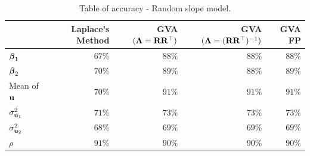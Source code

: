 \begin{table}
	{\footnotesize
	\begin{tabular}{|l|rrrr|}
		\hline
		                   & Laplace's Method & GVA $({\boldsymbol \Lambda} = {\bf R} {\bf R}^\top)$ & GVA $({\boldsymbol \Lambda} = ({\bf R} {\bf R}^\top)^{-1})$ & GVA FP \\
		\hline
		${\boldsymbol \beta}_1$         & $67\%$             & $88\%$                            & $88\%$                                   & $88\%$   \\
		${\boldsymbol \beta}_2$         & $70\%$             & $89\%$                            & $88\%$                                   & $89\%$   \\
		Mean of ${\bf u}$      & $70\%$             & $91\%$                            & $91\%$                                   & $91\%$   \\
		$\sigma^2_{{\bf u}_1}$ & $71\%$             & $73\%$                            & $73\%$                                   & $73\%$   \\
		$\sigma^2_{{\bf u}_2}$ & $68\%$             & $69\%$                            & $69\%$                                   & $69\%$   \\
		$\rho$             & $91\%$             & $90\%$                            & $90\%$                                   & $90\%$   \\
		\hline
	\end{tabular}
}\bigskip
	\caption{Table of accuracy - Random slope model.}
	\label{tab:accuracy_slope}
\end{table}
		
		
